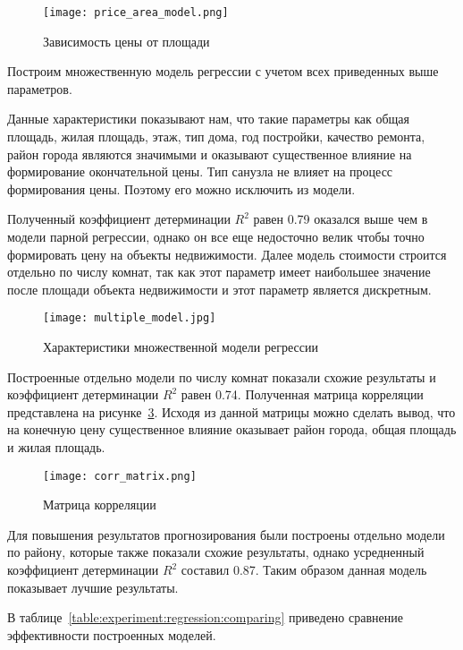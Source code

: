 \begin{figure}[!ht]
  \centering
  \texttt{[image: price\_area\_model.png]} 
  \caption{Зависимость цены от площади}
  \label{fig:experiment:price_area_model}
\end{figure}

Построим множественную модель регрессии с учетом всех приведенных выше параметров.

Данные характеристики показывают нам, что такие параметры как
общая площадь, жилая площадь, этаж, тип дома, год постройки, качество ремонта, район города являются значимыми и оказывают существенное влияние на формирование
окончательной цены. Тип санузла не влияет на процесс формирования цены. Поэтому его можно исключить из модели.

Полученный коэффициент детерминации $R^2$ равен 0.79 оказался выше чем в модели парной регрессии, однако он все еще
недосточно велик чтобы точно формировать цену на объекты недвижимости. Далее модель стоимости строится
отдельно по числу комнат, так как этот параметр имеет наибольшее значение после площади объекта недвижимости и этот параметр
является дискретным.

\begin{figure}[!ht]
  \centering
  \texttt{[image: multiple\_model.jpg]}
  \caption{Характеристики множественной модели регрессии}
  \label{fig:experiment:multiple_model}
\end{figure}

Построенные отдельно модели по числу комнат показали схожие результаты и коэффициент детерминации $R^2$ равен 0.74.
Полученная матрица корреляции представлена на рисунке~\ref{fig:experiment:corr_matrix}. Исходя из данной матрицы можно 
сделать вывод, что на конечную цену существенное влияние оказывает район города, общая площадь и жилая площадь.

\begin{figure}[!ht]
  \centering
  \texttt{[image: corr\_matrix.png]}
  \caption{Матрица корреляции}
  \label{fig:experiment:corr_matrix}
\end{figure}

Для повышения результатов прогнозирования были построены отдельно модели по району, которые также показали схожие результаты,
однако усредненный коэффициент детерминации $R^2$ составил 0.87. Таким образом данная модель показывает лучшие результаты.

В таблице~\ref{table:experiment:regression:comparing} приведено сравнение эффективности построенных моделей.

